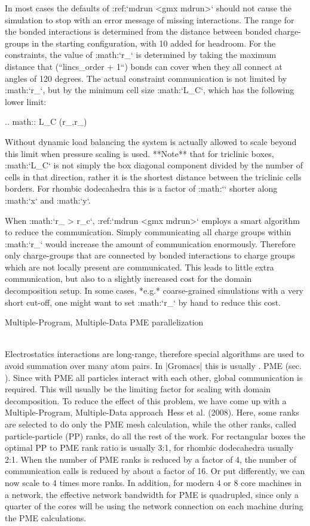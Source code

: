 {In most cases the defaults of :ref:`mdrun <gmx mdrun>` should not cause the
simulation to stop with an error message of missing interactions. The
range for the bonded interactions is determined from the distance
between bonded charge-groups in the starting configuration, with 10%
added for headroom. For the constraints, the value of
:math:`r_{}` is determined by taking the maximum distance
that (``lincs_order + 1``) bonds can cover when they all
connect at angles of 120 degrees. The actual constraint communication is
not limited by :math:`r_{}`, but by the minimum cell size
:math:`L_C`, which has the following lower limit:

.. math:: L_C \geq \max(r_{},r_{})

Without dynamic load balancing the system is actually allowed to scale
beyond this limit when pressure scaling is used. **Note** that for
triclinic boxes, :math:`L_C` is not simply the box diagonal component
divided by the number of cells in that direction, rather it is the
shortest distance between the triclinic cells borders. For rhombic
dodecahedra this is a factor of :math:`` shorter along
:math:`x` and :math:`y`.

When :math:`r_{} > r_c`, :ref:`mdrun <gmx mdrun>` employs a
smart algorithm to reduce the communication. Simply communicating all
charge groups within :math:`r_{}` would increase the amount
of communication enormously. Therefore only charge-groups that are
connected by bonded interactions to charge groups which are not locally
present are communicated. This leads to little extra communication, but
also to a slightly increased cost for the domain decomposition setup. In
some cases, *e.g.* coarse-grained simulations with a very short cut-off,
one might want to set :math:`r_{}` by hand to reduce this
cost.

Multiple-Program, Multiple-Data PME parallelization
~~~~~~~~~~~~~~~~~~~~~~~~~~~~~~~~~~~~~~~~~~~~~~~~~~~

Electrostatics interactions are long-range, therefore special algorithms
are used to avoid summation over many atom pairs. In |Gromacs| this is
usually . PME (sec. 
). Since with PME all
particles interact with each other, global communication is required.
This will usually be the limiting factor for scaling with domain
decomposition. To reduce the effect of this problem, we have come up
with a Multiple-Program, Multiple-Data approach Hess et al. (2008).
Here, some ranks are selected to do only the PME mesh calculation, while
the other ranks, called particle-particle (PP) ranks, do all the rest of
the work. For rectangular boxes the optimal PP to PME rank ratio is
usually 3:1, for rhombic dodecahedra usually 2:1. When the number of PME
ranks is reduced by a factor of 4, the number of communication calls is
reduced by about a factor of 16. Or put differently, we can now scale to
4 times more ranks. In addition, for modern 4 or 8 core machines in a
network, the effective network bandwidth for PME is quadrupled, since
only a quarter of the cores will be using the network connection on each
machine during the PME calculations.

}
